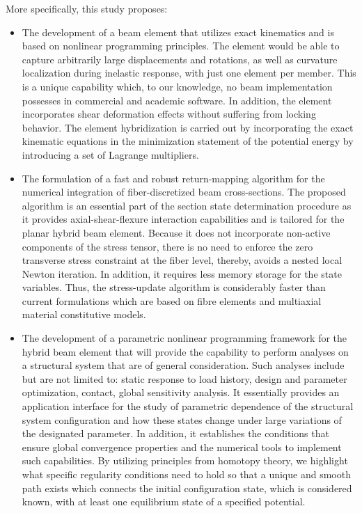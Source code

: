 More specifically, this study proposes:
\begin{itemize}
	\item The development of a beam element that utilizes exact kinematics and is 
	based on nonlinear programming principles. The element would be able to 
	capture 
	arbitrarily large displacements and rotations, as well as curvature localization 
	during inelastic response, with just one element per member. This is a 
	unique capability which, to our knowledge, no beam implementation possesses 
	in commercial and academic software. In addition, the element
	incorporates shear deformation effects without suffering from locking 
	behavior. The element hybridization is carried out by incorporating the 
	exact kinematic equations in the minimization statement of the potential 
	energy by introducing a set of Lagrange multipliers.
	
	\item The formulation of a fast and robust return-mapping algorithm for the 
	numerical integration of fiber-discretized beam cross-sections. The proposed 
	algorithm is an essential part of the section state determination procedure as it 
	provides axial-shear-flexure interaction capabilities and is tailored for the 
	planar hybrid beam element. Because it does not incorporate non-active components 
	of the stress tensor, there is no need to enforce the zero transverse stress 
	constraint at the fiber level, thereby, avoids a nested local Newton iteration. In 
	addition, it requires less memory storage for the state variables. Thus, 
	the stress-update algorithm is considerably faster than current 
	formulations which are based on fibre elements and multiaxial material 
	constitutive models.
	
	\item The development of a parametric nonlinear programming framework for 
	the hybrid beam 
	element that will provide the capability to perform analyses on a structural 
	system that are of general consideration. Such analyses include but are not 
	limited to: static response to load history, design and parameter optimization, 
	contact, global sensitivity analysis. It essentially provides an application 
	interface for the study of parametric dependence of the structural system 
	configuration and how these states change under large variations of the designated 
	parameter. In addition, it establishes the conditions that ensure global 
	convergence properties and the numerical tools to implement such capabilities. By 
	utilizing principles from homotopy theory, we highlight what specific
	regularity conditions need to hold so that a unique and smooth path exists which
	connects the initial configuration state, which is considered known, with at least 
	one equilibrium state of a specified potential. 
	

\end{itemize}
